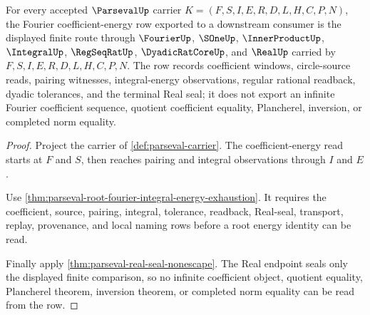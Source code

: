 \begin{theorem}
\label{thm:parseval-fourier-coefficient-energy-row}
For every accepted $\ParsevalUp$ carrier $K=(F,S,I,E,R,D,L,H,C,P,N)$, the Fourier coefficient-energy row exported to a downstream consumer is the displayed finite route through $\FourierUp$, $\SOneUp$, $\InnerProductUp$, $\IntegralUp$, $\RegSeqRatUp$, $\DyadicRatCoreUp$, and $\RealUp$ carried by $F,S,I,E,R,D,L,H,C,P,N$. The row records coefficient windows, circle-source reads, pairing witnesses, integral-energy observations, regular rational readback, dyadic tolerances, and the terminal Real seal; it does not export an infinite Fourier coefficient sequence, quotient coefficient equality, Plancherel, inversion, or completed norm equality.
\end{theorem}
\begin{proof}
Project the carrier of \autoref{def:parseval-carrier}. The coefficient-energy read starts at $F$ and $S$, then reaches pairing and integral observations through $I$ and $E$.

Use \autoref{thm:parseval-root-fourier-integral-energy-exhaustion}. It requires the coefficient, source, pairing, integral, tolerance, readback, Real-seal, transport, replay, provenance, and local naming rows before a root energy identity can be read.

Finally apply \autoref{thm:parseval-real-seal-nonescape}. The Real endpoint seals only the displayed finite comparison, so no infinite coefficient object, quotient equality, Plancherel theorem, inversion theorem, or completed norm equality can be read from the row.
\end{proof}

